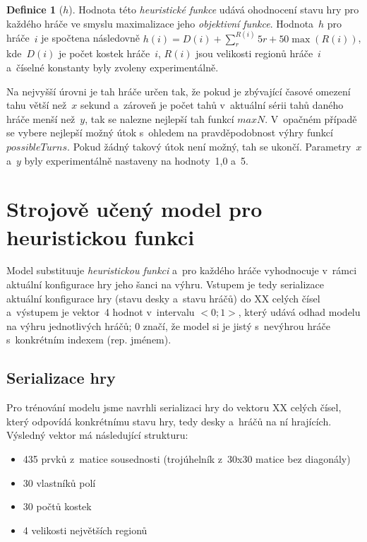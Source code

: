 \documentclass[11pt, a4paper]{article}
\theoremstyle{definition}
\newtheorem{definition}{Definice}[section]
\begin{document}
\begin{definition}[$ h $]
\label{def:h}
Hodnota této \emph{heuristické funkce} udává ohodnocení stavu hry pro
každého hráče ve smyslu maximalizace jeho \emph{objektivní funkce}.
Hodnota~$ h $ pro hráče~$ i $ je spočtena následovně $ h(i) = D(i) +
\sum_r^{R(i)} 5 r + 50 \max (R(i)) $, kde~$ D(i) $ je počet kostek
hráče~$ i $, $ R(i) $ jsou velikosti regionů hráče~$ i $ a~číselné konstanty
byly zvoleny experimentálně.
\end{definition}

Na nejvyšší úrovni je tah hráče určen tak, že pokud je zbývající časové
omezení tahu větší než~$ x $ sekund a~zároveň je počet tahů v~aktuální sérii
tahů daného hráče menší než~$ y $, tak se nalezne nejlepší tah funkcí
$ maxN $. V~opačném případě se vybere nejlepší možný útok s~ohledem na
pravděpodobnost výhry funkcí $ possibleTurns $. Pokud žádný takový útok
není možný, tah se ukončí. Parametry~$ x $ a~$ y $ byly experimentálně
nastaveny na hodnoty~1,0 a~5.


\section{Strojově učený model pro heuristickou funkci}
\label{sec:aiMl}

Model substituuje \emph{heuristickou funkci} a~pro každého hráče vyhodnocuje v~rámci aktuální konfigurace hry jeho šanci na výhru.
Vstupem je tedy serializace aktuální konfigurace hry (stavu desky a~stavu hráčů) do XX celých čísel a~výstupem je vektor~4 hodnot v~intervalu $<0;1>$, který udává odhad modelu na výhru jednotlivých hráčů; $0$ značí, že model si je jistý s~nevýhrou hráče s~konkrétním indexem (rep. jménem).

\subsection{Serializace hry}
\label{sec:serialiseGame}

Pro trénování modelu jsme navrhli serializaci hry do vektoru XX celých čísel, který odpovídá konkrétnímu stavu hry, tedy desky a~hráčů na ní hrajících. Výsledný vektor má následující strukturu:

\begin{itemize}
    \item 435 prvků z~matice sousednosti (trojúhelník z~30x30 matice bez diagonály) 
    \item 30 vlastníků polí
    \item 30 počtů kostek
    \item 4 velikosti největších regionů
\end{itemize}
\end{document}
